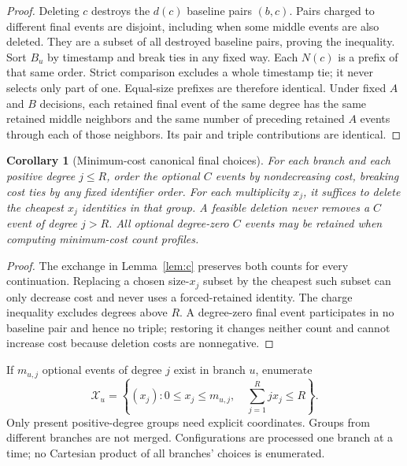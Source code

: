 \documentclass[11pt]{article}
\newtheorem{corollary}[theorem]{Corollary}
\theoremstyle{remark}
\begin{document}
\begin{proof}
Deleting $c$ destroys the $d(c)$ baseline pairs $(b,c)$. Pairs charged to
different final events are disjoint, including when some middle events are
also deleted. They are a subset of all destroyed baseline pairs, proving the
inequality. Sort $B_u$ by timestamp and break ties in any fixed way. Each
$N(c)$ is a prefix of that same order. Strict comparison excludes a whole
timestamp tie; it never selects only part of one. Equal-size prefixes are
therefore identical. Under fixed $A$ and $B$ decisions, each retained final
event of the same degree has the same retained middle neighbors and the same
number of preceding retained $A$ events through each of those neighbors.
Its pair and triple contributions are identical.
\end{proof}

\begin{corollary}[Minimum-cost canonical final choices]\label{cor:canonical}
For each branch and each positive degree $j\le R$, order the optional $C$
events by nondecreasing cost, breaking cost ties by any fixed identifier order.
For each multiplicity $x_j$, it suffices to delete the cheapest $x_j$ identities
in that group. A feasible deletion never removes a $C$ event of degree $j>R$.
All optional degree-zero $C$ events may be retained when computing
minimum-cost count profiles.
\end{corollary}

\begin{proof}
The exchange in Lemma~\ref{lem:c} preserves both counts for every continuation.
Replacing a chosen size-$x_j$ subset by the cheapest such subset can only
decrease cost and never uses a forced-retained identity. The charge inequality
excludes degrees above $R$. A degree-zero final event participates in no
baseline pair and hence no triple; restoring it changes neither count and
cannot increase cost because deletion costs are nonnegative.
\end{proof}

If $m_{u,j}$ optional events of degree $j$ exist in branch $u$, enumerate
\begin{equation}
 \mathcal X_u=\left\{(x_j):0\le x_j\le m_{u,j},\quad
                    \sum_{j=1}^{R}jx_j\le R\right\}.
 \label{eq:configs}
\end{equation}
Only present positive-degree groups need explicit coordinates. Groups from
different branches are not merged. Configurations are processed one branch
at a time; no Cartesian product of all branches' choices is enumerated.
\end{document}

